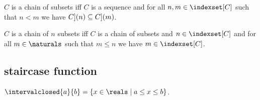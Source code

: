 \begin{definition}\label{cahin_of_subsets}
    $C$ is a chain of subsets iff
    $C$ is a sequence and for all $n,m \in \indexset[C]$ such that $n < m$ we have $\index[C](n) \subseteq \index[C](m)$.
\end{definition}

\begin{definition}\label{chain_of_n_subsets}
    $C$ is a chain of $n$ subsets iff
    $C$ is a chain of subsets and $n \in \indexset[C]$ 
    and for all $m \in \naturals$ such that $m \leq n$ we have $m \in \indexset[C]$.
\end{definition}






%
%



\subsection{staircase function}

\begin{definition}\label{intervalclosed}
    $\intervalclosed{a}{b} = \{x \in \reals \mid a \leq x \leq b\}$.
\end{definition}


